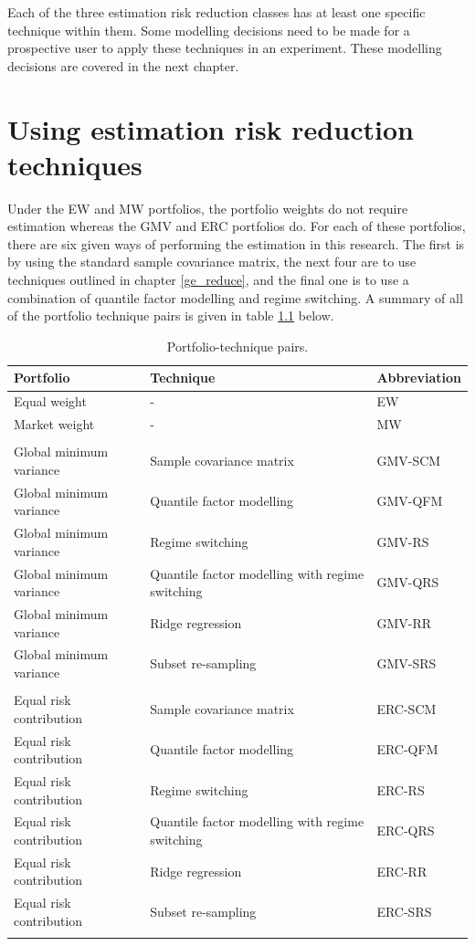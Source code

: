 \documentclass[a4paper,11pt,nocenter,bold,noupper,headcount]{mythesis}
\theoremstyle{plain}
\theoremstyle{definition}
\begin{document}
Each of the three estimation risk reduction classes has at least one specific technique within them. Some modelling decisions need to be made for a prospective user to apply these techniques in an experiment. These modelling decisions are covered in the next chapter.

\chapter{Using estimation risk reduction techniques} \label{some_maths}

Under the EW and MW portfolios, the portfolio weights do not require estimation whereas the GMV and ERC portfolios do. For each of these portfolios, there are six given ways of performing the estimation in this research. The first is by using the standard sample covariance matrix, the next four are to use techniques outlined in chapter \ref{ge_reduce}, and the final one is to use a combination of quantile factor modelling and regime switching. A summary of all of the portfolio technique pairs is given in table \ref{tab_pairs} below.

\begin{table} [h]
\footnotesize
\caption{Portfolio-technique pairs.}
\centering
 \begin{tabular}{p{5cm}p{5cm}p{2.5cm}} 
 \hline
\textbf{Portfolio} & \textbf{Technique} &  \textbf{Abbreviation}\\ 
\hline
Equal weight & - & EW \\
Market weight  & -&  MW \\
\\
Global minimum variance&Sample covariance matrix&GMV-SCM \\
Global minimum variance&Quantile factor modelling & GMV-QFM \\
Global minimum variance&Regime switching & GMV-RS \\
Global minimum variance&Quantile factor modelling with regime switching & GMV-QRS \\
Global minimum variance&Ridge regression & GMV-RR \\
Global minimum variance&Subset re-sampling & GMV-SRS \\
\\
Equal risk contribution&Sample covariance matrix&ERC-SCM \\
Equal risk contribution&Quantile factor modelling &ERC-QFM \\
Equal risk contribution&Regime switching & ERC-RS \\
Equal risk contribution&Quantile factor modelling with regime switching & ERC-QRS \\
Equal risk contribution&Ridge regression & ERC-RR \\
Equal risk contribution&Subset re-sampling & ERC-SRS \\
\\
 \hline
\end{tabular}
\label{tab_pairs}
\end{table}
\end{document}
